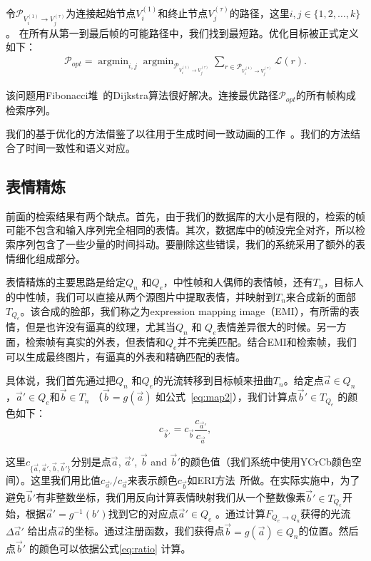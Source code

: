 令$\mathcal{P}_{V_i^{(1)}\to V_j^{(\tau)}}$为连接起始节点$V_i^{(1)}$和终止节点$V_j^{(\tau)}$的路径，这里$i,j\in\{1,2,\ldots,k\}$。
在所有从第一到最后帧的可能路径中，我们找到最短路。优化目标被正式定义如下：
\begin{eqnarray}\label{eq:dijkstra}
\mathcal{P}_{opt}=\mathop{\arg\min}_{i, j} \mathop{\arg\min}_{\mathcal{P}_{V_i^{(1)}\to V_j^{(\tau)}}}
        \sum_{r\in \mathcal{P}_{V_i^{(1)}\to V_j^{(\tau)}}}\mathcal{L}(r).
\end{eqnarray}

该问题用Fibonacci堆~\cite{algorithm}的Dijkstra算法很好解决。连接最优路径$\mathcal{P}_{opt}$的所有帧构成检索序列。

我们的基于优化的方法借鉴了以往用于生成时间一致动画的工作~\cite{Kovar_Gleicher,spacetime,photobios}。我们的方法结合了时间一致性和语义对应。

\subsection{表情精炼}\label{sec:emi}
前面的检索结果有两个缺点。首先，由于我们的数据库的大小是有限的，检索的帧可能不包含和输入序列完全相同的表情。其次，数据库中的帧没完全对齐，所以检索序列包含了一些少量的时间抖动。要删除这些错误，我们的系统采用了额外的表情细化组成部分。

表情精炼的主要思路是给定$Q_n$ 和$Q_e$，中性帧和人偶师的表情帧，还有$T_n$，目标人的中性帧，我们可以直接从两个源图片中提取表情，并映射到$T_n$来合成新的面部$T_{Q_e}$。该合成的脸部，我们称之为expression mapping image（EMI），有所需的表情，但是也许没有逼真的纹理，尤其当$Q_n$ 和 $Q_e$表情差异很大的时候。另一方面，检索帧有真实的外表，但表情和$Q_e$并不完美匹配。结合EMI和检索帧，我们可以生成最终图片，有逼真的外表和精确匹配的表情。

具体说，我们首先通过把$Q_n$ 和$Q_e$的光流转移到目标帧来扭曲$T_n$。给定点$\vec{a}\in Q_n$，$\vec{a}'\in Q_e$和$\vec{b}\in T_n$ （$\vec{b}=g(\vec{a})$ 如公式~\ref{eq:map2}），我们计算点$\vec{b}'\in T_{Q_e}$ 的颜色如下：
\begin{equation}\label{eq:ratio}
c_{\vec{b}'}=c_{\vec{b}}\frac{c_{\vec{a}'}}{c_{\vec{a}}},
\end{equation}

这里$c_{\{\vec{a},\vec{a}',\vec{b},\vec{b}'\}}$分别是点$\vec{a}$, $\vec{a}'$, $\vec{b}$ and $\vec{b}'$的颜色值（我们系统中使用YCrCb颜色空间）。这里我们用比值${c_{\vec{a}'}}/{c_{\vec{a}}}$来表示颜色$c_{\vec{b}}$如ERI方法~\cite{eri}所做。在实际实施中，为了避免$\vec{b}'$有非整数坐标，我们用反向计算表情映射我们从一个整数像素$\vec{b}'\in T_{Q_e}$开始，根据$\vec{a}'=g^{-1}(b')$找到它的对应点$\vec{a}'\in Q_e$ 。通过计算\mbox{\boldmath $F$}$_{Q_e \to Q_n}$获得的光流$\Delta \vec{a}'$ 给出点$\vec{a}$的坐标。通过注册函数，我们获得点$\vec{b}=g(\vec{a})\in Q_n$的位置。然后点$\vec{b}'$ 的颜色可以依据公式\ref{eq:ratio} 计算。

